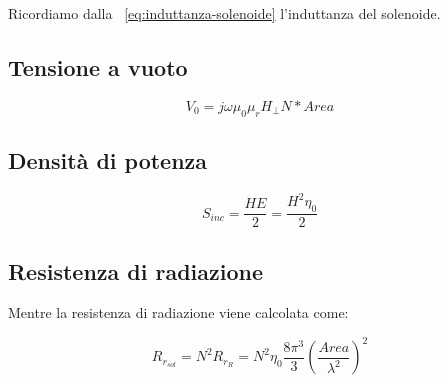 \documentclass[10pt,a4paper]{report}
\begin{document}
			Ricordiamo dalla ~\ref{eq:induttanza-solenoide} l'induttanza del solenoide.

		 	\subsection{Tensione a vuoto}

				 \[
				 V_0=j\omega\mu_0\mu_rH_{\perp}N*Area
				 \]

			\subsection{Densità di potenza}

			 	\[
			 	S_{inc}=\frac{HE}{2}=\frac{H^2\eta_0}{2}
			 	\]

			\subsection{Resistenza di radiazione}
				 Mentre la resistenza di radiazione viene calcolata come:

				 \[
				 R_{r_{sol}}=N^2R_{r_{R}}=N^2\eta_0\frac{8\pi^3}{3}(\frac{Area}{\lambda^2})^2
				 \]


        \newpage
        \null 
        \thispagestyle{empty} 
        \newpage
        
        \newpage
        \null 
        \thispagestyle{empty} 
        \newpage
\end{document}
